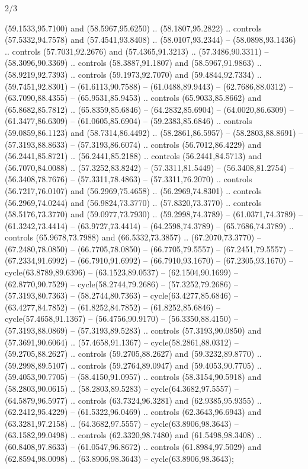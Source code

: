 \begin{flagdescription}{2/3}
\begin{scope}[xshift=0.3333\flaglength,yshift=0.5\flagwidth,scale=\flagwidth/711.3]
\begin{scope}
    (59.1533,95.7100) and (58.5967,95.6250) .. (58.1807,95.2822) .. controls
    (57.5332,94.7578) and (57.4541,93.8408) .. (58.0107,93.2344) --
    (58.0898,93.1436) .. controls (57.7031,92.2676) and (57.4365,91.3213) ..
    (57.3486,90.3311) -- (58.3096,90.3369) .. controls (58.3887,91.1807) and
    (58.5967,91.9863) .. (58.9219,92.7393) .. controls (59.1973,92.7070) and
    (59.4844,92.7334) .. (59.7451,92.8301) -- (61.6113,90.7588) --
    (61.0488,89.9443) -- (62.7686,88.0312) -- (63.7090,88.4355) --
    (65.9531,85.9453) .. controls (65.9033,85.8662) and (65.8682,85.7812) ..
    (65.8359,85.6846) -- (64.2832,85.6904) -- (64.0020,86.6309) --
    (61.3477,86.6309) -- (61.0605,85.6904) -- (59.2383,85.6846) .. controls
    (59.0859,86.1123) and (58.7314,86.4492) .. (58.2861,86.5957) --
    (58.2803,88.8691) -- (57.3193,88.8633) -- (57.3193,86.6074) .. controls
    (56.7012,86.4229) and (56.2441,85.8721) .. (56.2441,85.2188) .. controls
    (56.2441,84.5713) and (56.7070,84.0088) .. (57.3252,83.8242) --
    (57.3311,81.5449) -- (56.3408,81.2754) -- (56.3408,78.7676) --
    (57.3311,78.4863) -- (57.3311,76.2070) .. controls (56.7217,76.0107) and
    (56.2969,75.4658) .. (56.2969,74.8301) .. controls (56.2969,74.0244) and
    (56.9824,73.3770) .. (57.8320,73.3770) .. controls (58.5176,73.3770) and
    (59.0977,73.7930) .. (59.2998,74.3789) -- (61.0371,74.3789) --
    (61.3242,73.4414) -- (63.9727,73.4414) -- (64.2598,74.3789) --
    (65.7686,74.3789) .. controls (65.9678,73.7988) and (66.5332,73.3857) ..
    (67.2070,73.3770) -- (67.2480,78.0850) -- (66.7705,78.0850) --
    (66.7705,79.5557) -- (67.2451,79.5557) -- (67.2334,91.6992) --
    (66.7910,91.6992) -- (66.7910,93.1670) -- (67.2305,93.1670) --
    cycle(63.8789,89.6396) -- (63.1523,89.0537) -- (62.1504,90.1699) --
    (62.8770,90.7529) -- cycle(58.2744,79.2686) -- (57.3252,79.2686) --
    (57.3193,80.7363) -- (58.2744,80.7363) -- cycle(63.4277,85.6846) --
    (63.4277,84.7852) -- (61.8252,84.7852) -- (61.8252,85.6846) --
    cycle(57.4658,91.1367) -- (56.4756,90.9170) -- (56.3350,88.4150) --
    (57.3193,88.0869) -- (57.3193,89.5283) .. controls (57.3193,90.0850) and
    (57.3691,90.6064) .. (57.4658,91.1367) -- cycle(58.2861,88.0312) --
    (59.2705,88.2627) .. controls (59.2705,88.2627) and (59.3232,89.8770) ..
    (59.2998,89.5107) .. controls (59.2764,89.0947) and (59.4053,90.7705) ..
    (59.4053,90.7705) -- (58.4150,91.0957) .. controls (58.3154,90.5918) and
    (58.2803,90.0615) .. (58.2803,89.5283) -- cycle(64.3682,97.5557) --
    (64.5879,96.5977) .. controls (63.7324,96.3281) and (62.9385,95.9355) ..
    (62.2412,95.4229) -- (61.5322,96.0469) .. controls (62.3643,96.6943) and
    (63.3281,97.2158) .. (64.3682,97.5557) -- cycle(63.8906,98.3643) --
    (63.1582,99.0498) .. controls (62.3320,98.7480) and (61.5498,98.3408) ..
    (60.8408,97.8633) -- (61.0547,96.8672) .. controls (61.8984,97.5029) and
    (62.8594,98.0098) .. (63.8906,98.3643) -- cycle(63.8906,98.3643);


\end{scope}
\end{scope}
\end{flagdescription}
